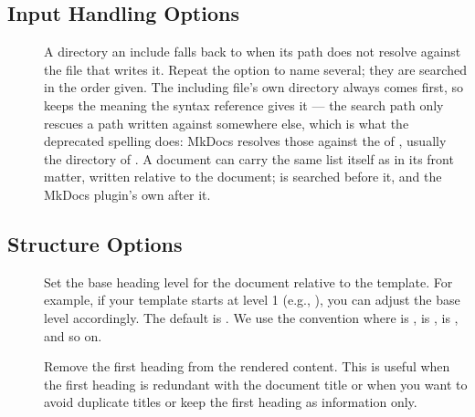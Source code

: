 \documentclass[a4paper,twoside]{article}
\begin{document}
\subsection{Input Handling Options}
\begin{description}
\item[{}] A directory an include falls back to when its path does not resolve against the file that writes it. Repeat the option to name several; they are searched in the order given. The including file's own directory always comes first, so  keeps the meaning the syntax reference gives it --- the search path only rescues a path written against somewhere else, which is what the deprecated  spelling does: MkDocs resolves those against the  of , usually the directory of . A document can carry the same list itself as  in its front matter, written relative to the document;  is searched before it, and the MkDocs plugin's own  after it.
\end{description}
\subsection{Structure Options}
\begin{description}
\item[{}] Set the base heading level for the document relative to the template. For example, if your template starts at level 1 (e.g., ), you can adjust the base level accordingly. The default is . We use the convention where  is ,  is ,  is , and so on.
\item[{}] Remove the first heading from the rendered content. This is useful when the first heading is redundant with the document title or when you want to avoid duplicate titles or keep the first heading as information only.
\end{description}
\end{document}
